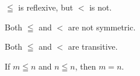 \begin{proposition}[Reflexivity]
$\leqq$ is reflexive, but
$<$ is not.
\end{proposition}

\begin{proposition}[Symmetry]
Both $\leqq$ and $<$ are not symmetric.
\end{proposition}

\begin{proposition}[Transitivity]
Both $\leqq$ and $<$ are transitive.
\end{proposition}

\begin{proposition}[Antisymmetry]
If $m \leqq n$ and $n \leqq n$, then $m = n$.
\end{proposition}

